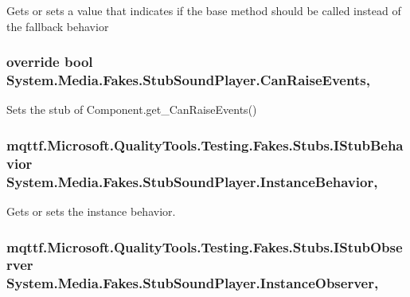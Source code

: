 Gets or sets a value that indicates if the base method should be called instead of the fallback behavior

\hypertarget{class_system_1_1_media_1_1_fakes_1_1_stub_sound_player_ab1f4b86b91bb029e05fd72e2ce346ba2}{
\subsubsection[{Can\-Raise\-Events}]{\setlength{\rightskip}{0pt plus 5cm}override bool System.\-Media.\-Fakes.\-Stub\-Sound\-Player.\-Can\-Raise\-Events\hspace{0.3cm}{\ttfamily [get]}, {\ttfamily [protected]}}}\label{class_system_1_1_media_1_1_fakes_1_1_stub_sound_player_ab1f4b86b91bb029e05fd72e2ce346ba2}


Sets the stub of Component.\-get\-\_\-\-Can\-Raise\-Events()

\hypertarget{class_system_1_1_media_1_1_fakes_1_1_stub_sound_player_a17a38589526ff5b72028e2c55e57fbca}{
\subsubsection[{Instance\-Behavior}]{\setlength{\rightskip}{0pt plus 5cm}mqttf.\-Microsoft.\-Quality\-Tools.\-Testing.\-Fakes.\-Stubs.\-I\-Stub\-Behavior System.\-Media.\-Fakes.\-Stub\-Sound\-Player.\-Instance\-Behavior\hspace{0.3cm}{\ttfamily [get]}, {\ttfamily [set]}}}\label{class_system_1_1_media_1_1_fakes_1_1_stub_sound_player_a17a38589526ff5b72028e2c55e57fbca}


Gets or sets the instance behavior.

\hypertarget{class_system_1_1_media_1_1_fakes_1_1_stub_sound_player_a8ef550504769aa3d6b39de4af52bc233}{
\subsubsection[{Instance\-Observer}]{\setlength{\rightskip}{0pt plus 5cm}mqttf.\-Microsoft.\-Quality\-Tools.\-Testing.\-Fakes.\-Stubs.\-I\-Stub\-Observer System.\-Media.\-Fakes.\-Stub\-Sound\-Player.\-Instance\-Observer\hspace{0.3cm}{\ttfamily [get]}, {\ttfamily [set]}}}\label{class_system_1_1_media_1_1_fakes_1_1_stub_sound_player_a8ef550504769aa3d6b39de4af52bc233}


